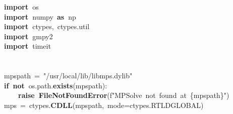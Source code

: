 \documentclass{article}\usepackage[]{graphicx}\usepackage[dvipsnames,table]{xcolor}
\makeatletter
\newcommand{\hlsng}[1]{\textcolor[rgb]{0.192,0.494,0.8}{#1}}%
\newcommand{\hlopt}[1]{\textcolor[rgb]{0,0,0}{#1}}%
\newcommand{\hldef}[1]{\textcolor[rgb]{0.345,0.345,0.345}{#1}}%
\newcommand{\hlkwa}[1]{\textcolor[rgb]{0.161,0.373,0.58}{\textbf{#1}}}%
\newcommand{\hlkwb}[1]{\textcolor[rgb]{0.69,0.353,0.396}{#1}}%
\newcommand{\hlkwd}[1]{\textcolor[rgb]{0.737,0.353,0.396}{\textbf{#1}}}%
\let\hlipl\hlkwb
\newenvironment{kframe}{%
 \def\at@end@of@kframe{}%
 \ifinner\ifhmode%
  \def\at@end@of@kframe{\end{minipage}}%
  \begin{minipage}{\columnwidth}%
 \fi\fi%
 \def\FrameCommand##1{\hskip\@totalleftmargin \hskip-\fboxsep
 \colorbox{shadecolor}{##1}\hskip-\fboxsep
     \hskip-\linewidth \hskip-\@totalleftmargin \hskip\columnwidth}%
 \MakeFramed {\advance\hsize-\width
   \@totalleftmargin\z@ \linewidth\hsize
   \@setminipage}}%
 {\par\unskip\endMakeFramed%
 \at@end@of@kframe}
\newenvironment{knitrout}{}{} %
\makeatother
\begin{document}
\begin{center}
\begin{minipage}[m]{15cm}
\begin{knitrout}\small
{}\color{fgcolor}\begin{kframe}
\noindent
\ttfamily
\hldef{}\hlkwa{import\ }\hldef{os}\hspace*{\fill}\\
\hldef{}\hlkwa{import\ }\hldef{numpy\ }\hlkwa{as\ }\hldef{np}\hspace*{\fill}\\
\hldef{}\hlkwa{import\ }\hldef{ctypes}\hlopt{,\ }\hldef{ctypes}\hlopt{.}\hldef{util}\hspace*{\fill}\\
\hldef{}\hlkwa{import\ }\hldef{gmpy2}\hspace*{\fill}\\
\hldef{}\hlkwa{import\ }\hldef{timeit}\hspace*{\fill}\\
\hldef{}\hspace*{\fill}\\
\hldef{}\hspace*{\fill}\\
\hldef{\textunderscore mps\textunderscore path\ }\hlopt{=\ }\hldef{}\hlsng{"/usr/local/lib/libmps.dylib"}\hldef{}\hspace*{\fill}\\
\hldef{}\hlkwa{if\ not\ }\hldef{os}\hlopt{.}\hldef{path}\hlopt{.}\hldef{}\hlkwd{exists}\hldef{}\hlopt{(}\hldef{\textunderscore mps\textunderscore path}\hlopt{):\ }\hspace*{\fill}\\
\hldef{}\hldef{\ \ \ \ }\hldef{}\hlkwa{raise\ }\hldef{}\hlkwd{FileNotFoundError}\hldef{}\hlopt{(}\hldef{f}\hlsng{"MPSolve\ not\ found\ at\ }\hlipl{\{\textunderscore mps\textunderscore path\}}\hlsng{"}\hldef{}\hlopt{)}\hspace*{\fill}\\
\hldef{\textunderscore mps\ }\hlopt{=\ }\hldef{ctypes}\hlopt{.}\hldef{}\hlkwd{CDLL}\hldef{}\hlopt{(}\hldef{\textunderscore mps\textunderscore path}\hlopt{,\ }\hldef{mode}\hlopt{=}\hldef{ctypes}\hlopt{.}\hldef{RTLD\textunderscore GLOBAL}\hlopt{)}\hspace*{\fill}\\
\hldef{}\hspace*{\fill}\\
\hldef{}\hspace*{\fill}\\

\end{kframe}
\end{knitrout}
\end{minipage}
\end{center}
\end{document}
